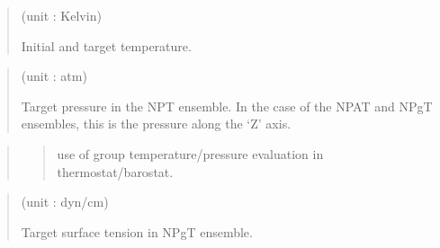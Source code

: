 \documentclass[a4paper,11pt,oneside,english]{sphinxmanual}
\begin{document}
 
\begin{quote}

 (unit : Kelvin)

Initial and target temperature.
\end{quote}

 
\begin{quote}

 (unit : atm)

Target pressure in the NPT ensemble.
In the case of the NPAT and NPgT ensembles,
this is the pressure along the ‘Z’ axis.
\end{quote}

 
\begin{quote}

\begin{quote}

use of group temperature/pressure evaluation in thermostat/barostat.
\end{quote}
\end{quote}

 
\begin{quote}

 (unit : dyn/cm)

Target surface tension in NPgT ensemble.
\end{quote}
\end{document}
